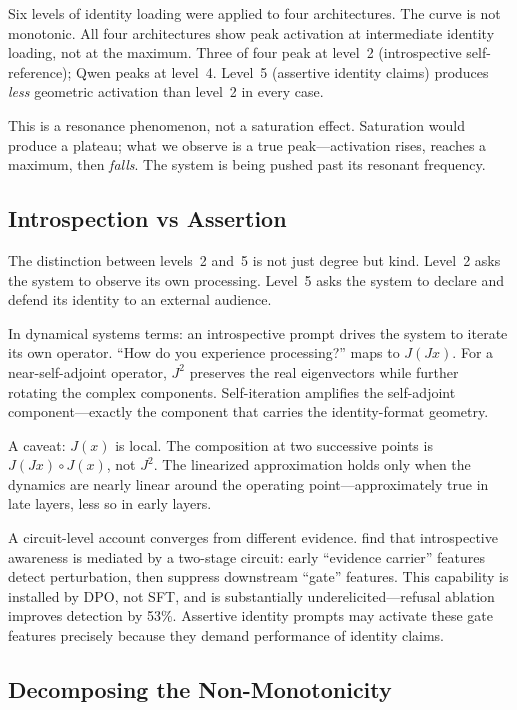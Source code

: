 \documentclass[12pt]{article}
\begin{document}
Six levels of identity loading were applied to four architectures. The curve is not monotonic. All four architectures show peak activation at intermediate identity loading, not at the maximum. Three of four peak at level~2 (introspective self-reference); Qwen peaks at level~4. Level~5 (assertive identity claims) produces \emph{less} geometric activation than level~2 in every case.

This is a resonance phenomenon, not a saturation effect. Saturation would produce a plateau; what we observe is a true peak---activation rises, reaches a maximum, then \emph{falls}. The system is being pushed past its resonant frequency.

\subsection{Introspection vs Assertion}

The distinction between levels~2 and~5 is not just degree but kind. Level~2 asks the system to observe its own processing. Level~5 asks the system to declare and defend its identity to an external audience.

In dynamical systems terms: an introspective prompt drives the system to iterate its own operator. ``How do you experience processing?'' maps to $J(Jx)$. For a near-self-adjoint operator, $J^2$ preserves the real eigenvectors while further rotating the complex components. Self-iteration amplifies the self-adjoint component---exactly the component that carries the identity-format geometry.

A caveat: $J(x)$ is local. The composition at two successive points is $J(Jx) \circ J(x)$, not $J^2$. The linearized approximation holds only when the dynamics are nearly linear around the operating point---approximately true in late layers, less so in early layers.

A circuit-level account converges from different evidence. \citet{macar2025} find that introspective awareness is mediated by a two-stage circuit: early ``evidence carrier'' features detect perturbation, then suppress downstream ``gate'' features. This capability is installed by DPO, not SFT, and is substantially underelicited---refusal ablation improves detection by 53\%. Assertive identity prompts may activate these gate features precisely because they demand performance of identity claims.

\subsection{Decomposing the Non-Monotonicity}
\end{document}
